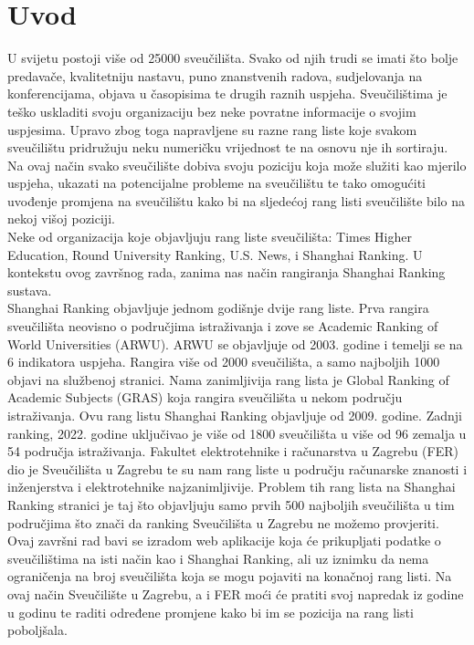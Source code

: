 \documentclass[times, utf8, zavrsni]{fer}
\begin{document}
\chapter{Uvod}
U svijetu postoji više od 25000 sveučilišta. Svako od njih trudi se imati što bolje predavače, kvalitetniju nastavu, puno znanstvenih radova, sudjelovanja na konferencijama,
objava u časopisima te drugih raznih uspjeha. Sveučilištima je teško uskladiti svoju organizaciju bez neke povratne informacije o svojim uspjesima. Upravo zbog toga napravljene su razne
rang liste koje svakom sveučilištu pridružuju neku numeričku vrijednost te na osnovu nje ih sortiraju. Na ovaj način svako sveučilište dobiva svoju poziciju 
koja može služiti kao mjerilo uspjeha, ukazati na potencijalne probleme na sveučilištu te tako omogućiti uvođenje promjena na sveučilištu kako bi 
na sljedećoj rang listi sveučilište bilo na nekoj višoj poziciji.\\ Neke od organizacija koje objavljuju rang liste sveučilišta: Times Higher Education, Round University Ranking,
U.S. News, i Shanghai Ranking. U kontekstu ovog završnog rada, zanima nas način rangiranja Shanghai Ranking sustava. \\ Shanghai Ranking objavljuje jednom godišnje dvije 
rang liste. Prva rangira sveučilišta neovisno o područjima istraživanja i zove se Academic Ranking of World Universities (ARWU). ARWU se objavljuje od 2003. godine i  
temelji se na 6 indikatora uspjeha. Rangira više od 2000 sveučilišta, a samo najboljih 1000 objavi na službenoj stranici. Nama zanimljivija rang lista je Global Ranking of Academic Subjects
(GRAS) koja rangira sveučilišta u nekom području istraživanja. Ovu rang listu Shanghai Ranking objavljuje od 2009. godine. Zadnji ranking, 2022. godine uključivao je više od 1800 sveučilišta 
u više od 96 zemalja u 54 područja istraživanja. Fakultet elektrotehnike i računarstva u Zagrebu (FER) dio je Sveučilišta u Zagrebu te su nam rang liste u području 
računarske znanosti i inženjerstva  i elektrotehnike  najzanimljivije. Problem tih rang lista 
na Shanghai Ranking stranici je taj što objavljuju samo prvih 500 najboljih sveučilišta u tim područjima što znači da ranking Sveučilišta u Zagrebu ne možemo provjeriti. 
Ovaj završni rad bavi se izradom web aplikacije koja će prikupljati podatke o sveučilištima na isti način kao i Shanghai Ranking, ali uz iznimku da nema ograničenja na 
broj sveučilišta koja se mogu pojaviti na konačnoj rang listi. Na ovaj način Sveučilište u Zagrebu, a i FER moći će pratiti svoj napredak iz godine u godinu te raditi određene 
promjene kako bi im se pozicija na rang listi poboljšala. 
\end{document}

